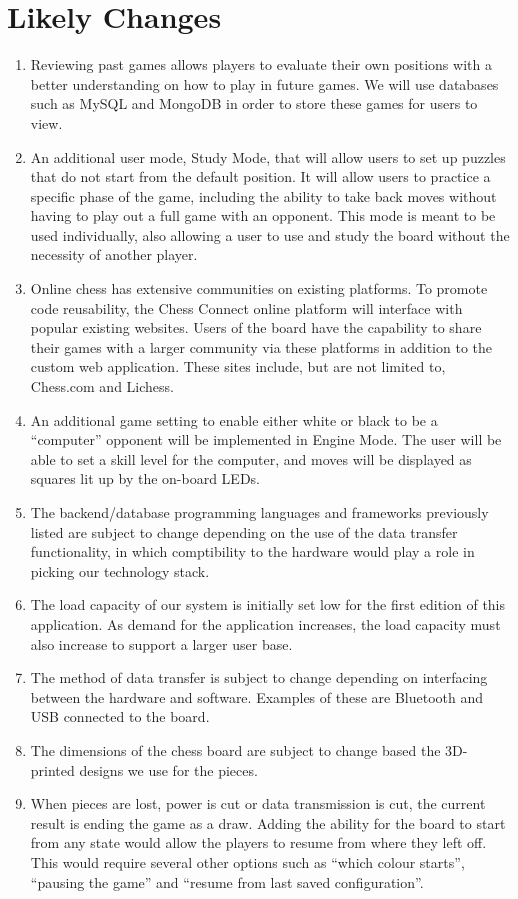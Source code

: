 \documentclass[12pt]{article}
\begin{document}
\section{Likely Changes}
\noindent
\begin{enumerate}[{LC}1., leftmargin=2\parindent]
    \item Reviewing past games allows players to evaluate their own positions with a better understanding on how to play in future games.
    We will use databases such as MySQL and MongoDB in order to store these games for users to view.
    \item An additional user mode, Study Mode, that will allow users to set up puzzles that do not start from the default position.
    It will allow users to practice a specific phase of the game, including the ability to take back moves without having to play out a full game with an opponent. 
    This mode is meant to be used individually, also allowing a user to use and study the board without the necessity of another player.
    \item Online chess has extensive communities on existing platforms. To promote code reusability, the Chess Connect online platform will interface with popular existing websites.
    Users of the board have the capability to share their games with a larger community via these platforms in addition to the custom web application. These sites include, but are not limited to, Chess.com and Lichess.
    \item An additional game setting to enable either white or black to be a ``computer'' opponent will be implemented in Engine Mode. The user will be able to set a skill level
    for the computer, and moves will be displayed as squares lit up by the on-board LEDs.
    \item The backend/database programming languages and frameworks previously listed
    are subject to change depending on the use of the data transfer functionality, in which comptibility to the hardware would play a role
    in picking our technology stack.  
    \item The load capacity of our system is initially set low for the
    first edition of this application. As demand for the application increases, the load capacity must also increase to support a
    larger user base.
    \item The method of data transfer is subject to change depending on
    interfacing between the hardware and software. Examples of these are Bluetooth and USB connected to the board.
    \item The dimensions of the chess board are subject to change based
    the 3D-printed designs we use for the pieces. 
    \item When pieces are lost, power is cut or data transmission is cut, the current result is ending the game as a draw. Adding the ability for the board to start from any state
    would allow the players to resume from where they left off. This would require several other options such as ``which colour starts'', ``pausing the game'' and ``resume from
    last saved configuration''.
\end{enumerate}
  
\end{document}
